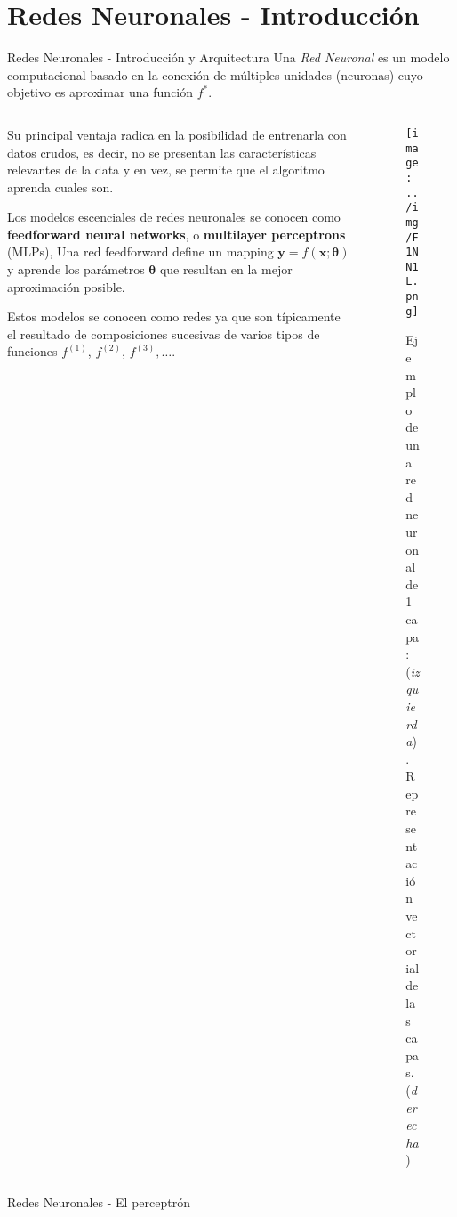\documentclass[9pt]{beamer}
\begin{document}
\section{Redes Neuronales - Introducción}
\begin{frame}{Redes Neuronales - Introducción y Arquitectura}
Una \textit{Red Neuronal} es un modelo computacional basado en la conexión de múltiples unidades (neuronas) cuyo objetivo es aproximar una función $f^{*}$. \pause
\newline 

\begin{columns}

  \begin{column}{0.5\textwidth}

  Su principal ventaja radica en la posibilidad de entrenarla con datos crudos, es decir, no se presentan las características relevantes de la data y en vez, se permite que el algoritmo aprenda cuales son. \pause

  \vspace{0.2cm}
  Los modelos escenciales de redes neuronales se conocen como \textbf{feedforward neural networks}, o \textbf{multilayer perceptrons} (MLPs), Una red feedforward define un mapping $\bm{y}=f(\bm{x}; \bm{\theta})$ y aprende los parámetros $\bm{\theta}$ que resultan en la mejor aproximación posible. \pause 
  \vspace{0.2cm}

  Estos modelos se conocen como redes ya que son típicamente el resultado de composiciones sucesivas de varios tipos de funciones $f^{(1)}$, $f^{(2)}$, $f^{(3)}, \dots$. \pause 

  \end{column}

  \begin{column}{0.5\textwidth}
  \begin{figure}[H]
  \centering
  \texttt{[image: ../img/F1NN1L.png]}
  \caption{Ejemplo de una red neuronal de 1 capa: (\textit{izquierda}). \\  Representación vectorial de las capas. (\textit{derecha})}
\end{figure}

  \end{column}

\end{columns}



\end{frame}

\begin{frame}{Redes Neuronales - El perceptrón}




\end{frame}


%
\end{document}
